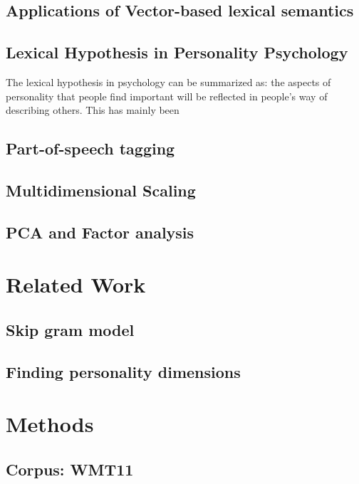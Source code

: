 \documentclass[10pt,letterpaper]{article}
\begin{document}
\subsection{Applications of Vector-based lexical semantics}


\subsection{Lexical Hypothesis in Personality Psychology}


The lexical hypothesis in psychology can be summarized as: the aspects of personality that people find important will be reflected in people's way of describing others. This has mainly been

\subsection{Part-of-speech tagging}

\subsection{Multidimensional Scaling}

\subsection{PCA and Factor analysis}

\section{Related Work}

\subsection{Skip gram model}

\subsection{Finding personality dimensions}

\section{Methods}

\subsection{Corpus: WMT11}
\end{document}
